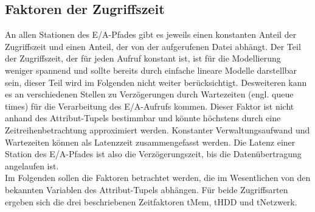 \documentclass[
	twoside,
	12pt,
	a4paper,
	BCOR10mm,
	DIV14,
	listof=totoc,
	bibliography=totoc,
	headsepline
]{scrreprt}
\begin{document}
\subsection{Faktoren der Zugriffszeit}
An allen Stationen des E/A-Pfades gibt es jeweils einen konstanten Anteil der Zugriffszeit und einen Anteil, der von der aufgerufenen Datei abhängt. 
Der Teil der Zugriffszeit, der für jeden Aufruf konstant ist, ist für die Modellierung weniger spannend und sollte bereits durch einfache lineare Modelle darstellbar sein, dieser Teil wird im Folgenden nicht weiter berücksichtigt.
Desweiteren kann es an verschiedenen Stellen zu Verzögerungen durch Wartezeiten (engl. queue times) für die Verarbeitung des E/A-Aufrufs kommen. Dieser Faktor ist nicht anhand des Attribut-Tupels bestimmbar und könnte höchstens durch eine Zeitreihenbetrachtung approximiert werden. Konstanter Verwaltungsaufwand und Wartezeiten können als Latenzzeit zusammengefasst werden. Die Latenz einer Station des E/A-Pfades ist also die Verzögerungszeit, bis die Datenübertragung angelaufen ist.\\
Im Folgenden sollen die Faktoren betrachtet werden, die im Wesentlichen von den bekannten Variablen des Attribut-Tupels abhängen.
Für beide Zugriffsarten ergeben sich die drei beschriebenen Zeitfaktoren tMem, tHDD und tNetzwerk.
\end{document}
